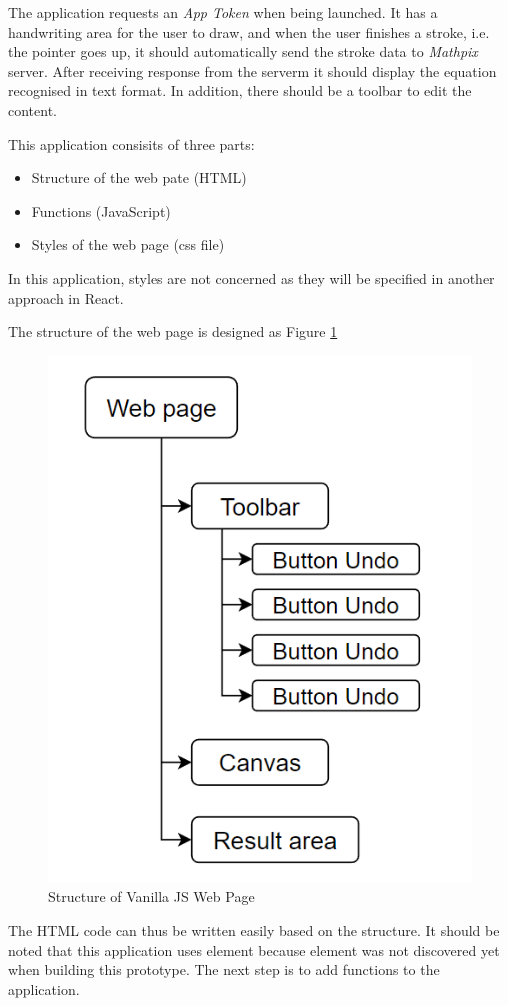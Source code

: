 \documentclass[12pt,twoside]{report}
\begin{document}
The application
requests an \textit{App Token} when being launched. It has a handwriting area
for the user to draw, and when the user finishes a stroke, i.e. the pointer goes
up, it should automatically send the stroke data to \textit{Mathpix} server.
After receiving response from the serverm it should display the equation
recognised in text format. In addition, there should be a toolbar to edit the
content. 

This application consisits of three parts: 
\begin{itemize}
    \item Structure of the web pate (HTML)
    \item Functions (JavaScript)
    \item Styles of the web page (css file)
\end{itemize}

In this application, styles are not concerned as they will be specified in another approach in React. 

The structure of the web page is designed as Figure \ref{fig:vanillajs-structure}

\begin{figure}
    \centering
    \includegraphics[width=0.5\linewidth, frame]{figures/vanillajs-structure.png}
    \caption{Structure of Vanilla JS Web Page}
    \label{fig:vanillajs-structure}
\end{figure}

The HTML code can thus be written easily based on the structure. It should be
noted that this application uses  element because 
element was not discovered yet when building this prototype. The next step is to
add functions to the application. 
\end{document}
